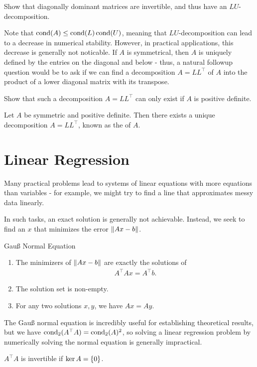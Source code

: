 \begin{exercise}
	Show that diagonally dominant matrices are invertible, and thus have an $LU$-decomposition.
\end{exercise}
Note that $\operatorname{cond}(A) \leq \operatorname{cond}(L)\operatorname{cond}(U)$, meaning that $LU$-decomposition can lead to a decrease in numerical stability. However, in practical applications, this decrease is generally not noticable.
\newpar
If $A$ is symmetrical, then $A$ is uniquely defined by the entries on the diagonal and below - thus, a natural followup question would be to ask if we can find a decomposition $A = LL^\top$ of $A$ into the product of a lower diagonal matrix with its transpose.
\begin{exercise}
	Show that such a decomposition $A = L L^\top$ can only exist if $A$ is positive definite.
\end{exercise}
\begin{exercise}
	Let $A$ be symmetric and positive definite. Then there exists a unique decomposition $A = LL^\top$, known as the  of $A$.
\end{exercise}

\section{Linear Regression}

Many practical problems lead to systems of linear equations with more equations than variables - for example, we might try to find a line that approximates messy data linearly.

In such tasks, an exact solution is generally not achievable. Instead, we seek to find an $x$ that minimizes the error $\norm{Ax - b}$.
\begin{importanttheorem}{Gauß Normal Equation}{}
	\begin{enumerate}
		\item The minimizers of $\norm{Ax - b}$ are exactly the solutions of 
		\begin{align*}
			A^\top A x = A^\top b.
		\end{align*}
		\item The solution set is non-empty.
		\item For any two solutions $x,y$, we have $Ax = Ay$.
	\end{enumerate}
\end{importanttheorem}

The Gauß normal equation is incredibly useful for establishing theoretical results, but we have $\operatorname{cond}_2(A^\top A) = \operatorname{cond}_2(A)^2$, so solving a linear regression problem by numerically solving the normal equation is generally impractical.
\begin{exercise}
	$A^\top A$ is invertible if $\ker A = \qty{0}$.
\end{exercise}

